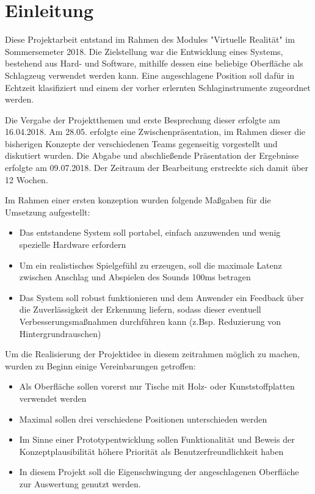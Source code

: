 \section*{Einleitung}
Diese Projektarbeit entstand im Rahmen des Modules "Virtuelle Realität" im Sommersemeter 2018. 
Die Zielstellung war die Entwicklung eines Systems, bestehend aus Hard- und Software, mithilfe dessen eine beliebige Oberfläche als Schlagzeug verwendet werden kann.
Eine angeschlagene Position soll dafür in Echtzeit klasifiziert und einem der vorher erlernten Schlaginstrumente zugeordnet werden.

Die Vergabe der Projektthemen und erste Besprechung dieser erfolgte am 16.04.2018. Am 28.05. erfolgte eine Zwischenpräsentation, im Rahmen dieser die bisherigen Konzepte der verschiedenen Teams gegenseitig vorgestellt und diskutiert wurden. 
Die Abgabe und abschließende Präsentation der Ergebnisse erfolgte am 09.07.2018. 
Der Zeitraum der Bearbeitung erstreckte sich damit über 12 Wochen.

Im Rahmen einer ersten konzeption wurden folgende Maßgaben für die Umsetzung aufgestellt:
\begin{itemize}
	\item Das entstandene System soll portabel, einfach anzuwenden und wenig spezielle Hardware erfordern
	\item Um ein realistisches Spielgefühl zu erzeugen, soll die maximale Latenz zwischen Anschlag und Abspielen des Sounds 100ms betragen
	\item Das System soll robust funktionieren und dem Anwender ein Feedback über die Zuverlässigkeit der Erkennung liefern, sodass dieser eventuell Verbesserungsmaßnahmen durchführen kann (z.Bsp. Reduzierung von Hintergrundrauschen)
\end{itemize}

Um die Realisierung der Projektidee in diesem zeitrahmen möglich zu machen, wurden zu Beginn einige Vereinbarungen getroffen:
\begin{itemize}
	\item Als Oberfläche sollen vorerst nur Tische mit Holz- oder Kunststoffplatten verwendet werden
	\item Maximal sollen drei verschiedene Positionen unterschieden werden
	\item Im Sinne einer Prototypentwicklung sollen Funktionalität und Beweis der Konzeptplausibilität höhere Priorität als Benutzerfreundlichkeit haben
    \item In diesem Projekt soll die Eigenschwingung der angeschlagenen Oberfläche zur Auswertung genutzt werden. 
\end{itemize}


